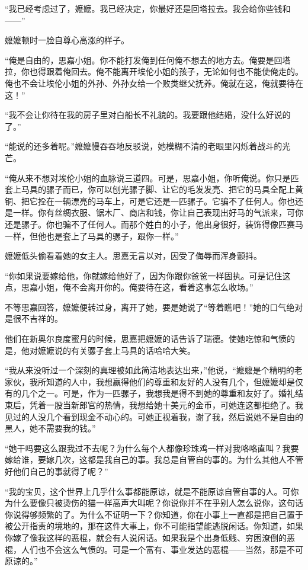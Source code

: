 \par “我已经考虑过了，嬷嬷。我已经决定，你最好还是回塔拉去。我会给你些钱和——”
\par 嬷嬷顿时一脸自尊心高涨的样子。
\par “俺是自由的，思嘉小姐。你不能打发俺到任何俺不想去的地方去。俺要是回塔拉，你也得跟着俺回去。俺不能离开埃伦小姐的孩子，无论如何也不能使俺走的。俺也不会让埃伦小姐的外孙、外孙女给一个败类继父抚养。俺就在这，俺就要待在这！”
\par “我不会让你待在我的房子里对白船长不礼貌的。我要跟他结婚，没什么好说的了。”
\par “能说的还多着呢。”嬷嬷慢吞吞地反驳说，她模糊不清的老眼里闪烁着战斗的光芒。
\par “俺从来不想对埃伦小姐的血脉说三道四。可是，思嘉小姐，你听俺说。你只是匹套上马具的骡子而已，你可以刨光骡子脚、让它的毛发发亮、把它的马具全配上黄铜、把它拴在一辆漂亮的马车上，可是它还是一匹骡子。它骗不了任何人。你也还是一样。你有丝绸衣服、锯木厂、商店和钱，你让自己表现出好马的气派来，可你还是骡子。你也骗不了任何人。而那个姓白的小子，他出身很好，装饰得像匹赛马一样，但他也是套上了马具的骡子，跟你一样。”
\par 嬷嬷低头偷看着她的女主人。思嘉无言以对，因受了侮辱而浑身颤抖。
\par “你如果说要嫁给他，你就嫁给他好了，因为你跟你爸爸一样固执。可是记住这点，思嘉小姐，俺不会离开你的。俺要待在这，看着这事怎么收场。”
\par 不等思嘉回答，嬷嬷便转过身，离开了她，要是她说了“等着瞧吧！”她的口气绝对是很不吉祥的。
\par 他们在新奥尔良度蜜月的时候，思嘉把嬷嬷的话告诉了瑞德。使她吃惊和气愤的是，他对嬷嬷说的有关骡子套上马具的话哈哈大笑。
\par “我从来没听过一个深刻的真理被如此简洁地表达出来，”他说，“嬷嬷是个精明的老家伙，我所知道的人中，我想赢得他们的尊重和友好的人没有几个，但嬷嬷却是仅有的几个之一。可是，作为一匹骡子，我想我是得不到她的尊重和友好了。婚礼结束后，凭着一股当新郎官的热情，我想给她十美元的金币，可她连这都拒绝了。我见过的人没几个看到现金不动心的。可她正视着我，谢了我，然后说她不是自由的黑人，她不需要我的钱。”
\par “她干吗要这么跟我过不去呢？为什么每个人都像珍珠鸡一样对我咯咯直叫？我要嫁给谁，要嫁几次，这都是我自己的事。我总是自管自的事的。为什么其他人不管好他们自己的事就得了呢？”
\par “我的宝贝，这个世界上几乎什么事都能原谅，就是不能原谅自管自事的人。可你为什么要像只被烫伤的猫一样高声大叫呢？你说你并不在乎别人怎么说你，这句话你说得够频繁的了。为什么不证明一下？你知道，你在小事上一直都是把自己置于被公开指责的境地的，那在这件大事上，你不可能指望能逃脱闲话。你知道，如果你嫁了像我这样的恶棍，就会有人说闲话。如果我是个出身低贱、穷困潦倒的恶棍，人们也不会这么气愤的。可是一个富有、事业发达的恶棍——当然，那是不可原谅的。”

